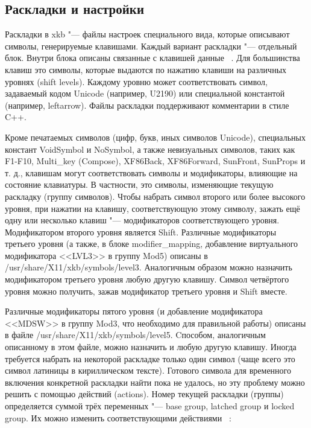 \documentclass[10pt, a5paper]{article}
\begin{document}
\subsection*{Раскладки и настройки}

Раскладки в xkb "--- файлы настроек специального вида, которые описывают символы, генерируемые клавишами. Каждый вариант раскладки "--- отдельный блок. Внутри блока описаны связанные с клавишей данные ~\cite{Kononova1}. Для большинства клавиш это символы, которые выдаются по нажатию клавиши на различных уровнях (shift levels). 
Каждому уровню может соответствовать символ, задаваемый кодом Unicode (например, U2190) или специальной константой (например, leftarrow). Файлы раскладки поддерживают комментарии в стиле C++.

Кроме печатаемых символов (цифр, букв, иных символов \linebreak Unicode), специальных констант VoidSymbol и NoSymbol, а также невизуальных символов, таких как F1-F10, Multi\_key \linebreak (Compose), XF86Back, XF86Forward, SunFront, SunProps и т. д., клавишам могут соответствовать символы и модификаторы, влияющие на состояние клавиатуры. В частности, это символы, изменяющие текущую раскладку (группу символов). 
Чтобы набрать символ второго или более высокого уровня, при нажатии на клавишу, соответствующую этому символу, зажать ещё одну или несколько клавиш "--- модификаторов  соответствующего уровня. Модификатором второго уровня является Shift. Различные модификаторы третьего уровня (а также, в блоке modifier\_mapping, добавление виртуального модификатора <<LVL3>> в группу Mod5) описаны в /usr/share/X11/xkb/symbols/level3. Аналогичным образом можно назначить модификатором третьего уровня любую другую клавишу. Символ четвёртого уровня можно получить, зажав модификатор третьего уровня и Shift вместе.

Различные модификаторы пятого уровня (и добавление модификатора <<MDSW>> в группу Mod3, что необходимо для правильной работы) описаны в файле /usr/share/X11/xkb/symbols/level5. Cпособом, аналогичным описанному в этом файле, можно назначить и любую другую клавишу.
Иногда требуется набрать на некоторой раскладке только один символ (чаще всего это символ латиницы в кириллическом тексте). Готового символа для временного включения конкретной раскладки найти пока не удалось, но эту проблему можно решить с помощью действий (actions). Номер текущей раскладки (группы) определяется суммой трёх переменных "--- base group, latched group и locked group. Их можно изменить соответствующими действиями ~\cite{Kononova1}:
\end{document}
